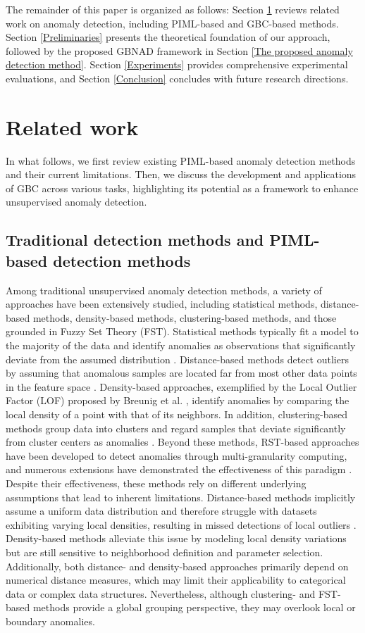 \documentclass[times, review, 10pt]{elsarticle}
\begin{document}
The remainder of this paper is organized as follows: Section \ref{Related work} reviews related work on anomaly detection, including PIML-based and GBC-based methods. Section \ref{Preliminaries} presents the theoretical foundation of our approach, followed by the proposed GBNAD framework in Section \ref{The proposed anomaly detection method}. Section \ref{Experiments} provides comprehensive experimental evaluations, and Section \ref{Conclusion} concludes with future research directions.

\section{Related work}
\label{Related work}
In what follows, we first review existing PIML-based anomaly detection methods and their current limitations. Then, we discuss the development and applications of GBC across various tasks, highlighting its potential as a framework to enhance unsupervised anomaly detection.
\subsection{Traditional detection methods and PIML-based detection methods}

{
Among traditional unsupervised anomaly detection methods, a variety of approaches have been extensively studied, including statistical methods, distance-based methods, density-based methods, clustering-based methods, and those grounded in Fuzzy Set Theory (FST). Statistical methods typically fit a model to the majority of the data and identify anomalies as observations that significantly deviate from the assumed distribution \cite{rousseeuw2018anomaly}. Distance-based methods detect outliers by assuming that anomalous samples are located far from most other data points in the feature space \cite{dang2015distance}. Density-based approaches, exemplified by the Local Outlier Factor (LOF) proposed by Breunig et al. \cite{Breunig2000LOF}, identify anomalies by comparing the local density of a point with that of its neighbors. In addition, clustering-based methods group data into clusters and regard samples that deviate significantly from cluster centers as anomalies \cite{degirmenci2022efficient}. Beyond these methods, RST-based approaches have been developed to detect anomalies through multi-granularity computing, and numerous extensions have demonstrated the effectiveness of this paradigm \cite{chen2025label}.
Despite their effectiveness, these methods rely on different underlying assumptions that lead to inherent limitations. Distance-based methods implicitly assume a uniform data distribution and therefore struggle with datasets exhibiting varying local densities, resulting in missed detections of local outliers \cite{li2022robust}. Density-based methods alleviate this issue by modeling local density variations but are still sensitive to neighborhood definition and parameter selection. {Additionally}, both distance- and density-based approaches primarily depend on numerical distance measures, which may limit their applicability to categorical data or complex data structures. Nevertheless, although clustering- and FST- based methods provide a global grouping perspective, they may overlook local or boundary anomalies.
}
\end{document}
